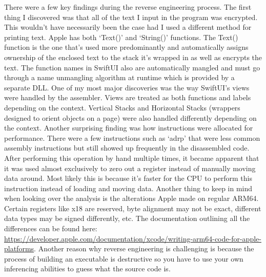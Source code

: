 \documentclass[12pt]{article}
\begin{document}
There were a few key findings during the reverse engineering process. The first thing I discovered was that all of the text I input in the program was encrypted. This wouldn’t have necessarily been the case had I used a different method for printing text. Apple has both ‘Text()’ and ‘String()’ functions. The Text() function is the one that’s used more predominantly and automatically assigns ownership of the enclosed text to the stack it’s wrapped in as well as encrypts the text. The function names in SwiftUI also are automatically mangled and must go through a name unmangling algorithm at runtime which is provided by a separate DLL. One of my most major discoveries was the way SwiftUI’s views were handled by the assembler. Views are treated as both functions and labels depending on the context. Vertical Stacks and Horizontal Stacks (wrappers designed to orient objects on a page) were also handled differently depending on the context. Another surprising finding was how instructions were allocated for performance. There were a few instructions such as ‘adrp’ that were less common assembly instructions but still showed up frequently in the disassembled code. After performing this operation by hand multiple times, it became apparent that it was used almost exclusively to zero out a register instead of manually moving data around. Most likely this is because it’s faster for the CPU to perform this instruction instead of loading and moving data. Another thing to keep in mind when looking over the analysis is the alterations Apple made on regular ARM64. Certain registers like x18 are reserved, byte alignment may not be exact, different data types may be signed differently, etc. The documentation outlining all the differences can be found here: \url{https://developer.apple.com/documentation/xcode/writing-arm64-code-for-apple-platforms}. 
Another reason why reverse engineering is challenging is because the process of building an executable is destructive so you have to use your own inferencing abilities to guess what the source code is. 
\end{document}
